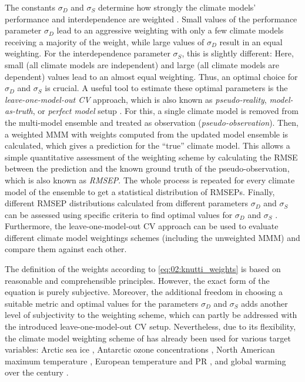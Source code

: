 The constants $\sigma_D$ and $\sigma_S$ determine how strongly the climate
models' performance and interdependence are weighted \autocite{Knutti2017a}.
Small values of the performance parameter $\sigma_D$ lead to an aggressive
weighting with only a few climate models receiving a majority of the weight,
while large values of $\sigma_D$ result in an equal weighting. For the
interdependence parameter $\sigma_S$, this is slightly different: Here, small
(all climate models are independent) and large (all climate models are
dependent) values lead to an almost equal weighting. Thus, an optimal choice
for $\sigma_D$ and $\sigma_S$ is crucial. A useful tool to estimate these
optimal parameters is the \emph{leave-one-model-out \ac{CV}} approach, which is
also known as \emph{pseudo-reality}, \emph{model-as-truth}, or \emph{perfect
  model} setup \autocite{Elia2002, Karpechko2013}. For this, a single climate
model is removed from the multi-model ensemble and treated as observation
(\emph{pseudo-observation}). Then, a weighted \ac{MMM} with weights computed
from the updated model ensemble is calculated, which gives a prediction for the
\enquote{true} climate model. This allows a simple quantitative assessment of
the weighting scheme by calculating the \ac{RMSE} between the prediction and
the known ground truth of the pseudo-observation, which is also known as
\emph{\ac{RMSEP}}. The whole process is repeated for every climate model of the
ensemble to get a statistical distribution of \acp{RMSEP}. Finally, different
\ac{RMSEP} distributions calculated from different parameters $\sigma_D$ and
$\sigma_S$ can be assessed using specific criteria to find optimal values for
$\sigma_D$ and $\sigma_S$ \autocite{Knutti2017a}. Furthermore, the
leave-one-model-out \ac{CV} approach can be used to evaluate different climate
model weightings schemes (including the unweighted \ac{MMM}) and compare them
against each other.

The definition of the weights according to \cref{eq:02:knutti_weights} is based
on reasonable and comprehensible principles. However, the exact form of the
equation is purely subjective. Moreover, the additional freedom in choosing a
suitable metric and optimal values for the parameters $\sigma_D$ and $\sigma_S$
adds another level of subjectivity to the weighting scheme, which can partly be
addressed with the introduced leave-one-model-out \ac{CV} setup. Nevertheless,
due to its flexibility, the climate model weighting scheme of
\textcite{Knutti2017a} has already been used for various target variables:
Arctic sea ice \autocite{Knutti2017a}, Antarctic ozone concentrations
\autocite{Amos2020}, North American maximum temperature \autocite{Lorenz2018},
European temperature and \acl{PR} \autocite{Brunner2019, Merrifield2020}, and
global warming over the  century \autocite{Brunner2020, Liang2020a}.


